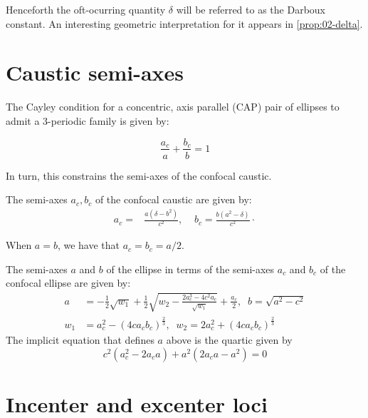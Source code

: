 Henceforth the oft-ocurring quantity $\delta$ will be referred to as the Darboux constant. An interesting geometric interpretation for it appears in \cref{prop:02-delta}.


\section{Caustic semi-axes}

The Cayley condition for a concentric, axis parallel (CAP) pair of ellipses to admit a 3-periodic family is given by:

\begin{equation} \frac{a_c}{a}+\frac{b_c}{b}=1
\label{eqn:n3-cayley}
\end{equation}

In turn, this constrains the semi-axes of the confocal caustic.

\begin{proposition}
The semi-axes $a_c,b_c$ of the confocal caustic are given by:
\begin{align*}
a_c=&\frac{a\left(\delta-{b}^{2}\right)}{c^2},\;\;\;\;
b_c=\frac{b\left({a}^{2}-\delta\right)}{c^2}\cdot
\end{align*}
\label{prop:02-n3-caustic}
\end{proposition}

When $a=b$, we have that $a_c=b_c=a/2$.

\begin{proposition}
The semi-axes $a$ and $b$ of the ellipse in terms of the semi-axes $a_c$ and $b_c$ of the confocal ellipse are given by:
\begin{align*}
a&= -\frac{1}{2} \sqrt{w_1} + \frac{1}{2} \sqrt{ w_2 -\frac{ 2 a_c^3 - 4 c^2a_c}{\sqrt{w_1}} } +\frac{a_c}{2},\;\; b=\sqrt{a^2-c^2}\\
w_1&=a_c^2-(4 c a_c b_c)^{\frac{2}{3}},\;\; w_2=2 a_c^2+ (4 c a_c b_c)^{\frac{2}{3}}
\end{align*}
The implicit equation that defines $a$ above is the quartic  given by
\[c^2( a_c^2   - 2   a_c   a )+ a^2(2a_c a  - a^2)=0\]
\label{prop:02-caustic-to-billiard}
\end{proposition}

\section{Incenter and excenter loci}
\label{sec:02-inc-exc-loci}

